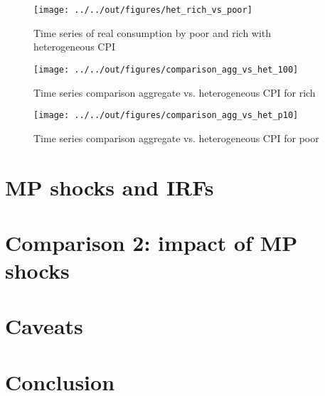 \documentclass{article}
\begin{document}
\begin{figure}
	\centering
	\texttt{[image: ../../out/figures/het\_rich\_vs\_poor]}
	\caption{Time series of real consumption by poor and rich with heterogeneous CPI }
	\label{f2}
\end{figure}

\begin{figure}
	\centering
    \texttt{[image: ../../out/figures/comparison\_agg\_vs\_het\_100]}
	\caption{Time series comparison aggregate vs. heterogeneous CPI for rich}
	\label{f3}
\end{figure}

\begin{figure}
	\centering
	\texttt{[image: ../../out/figures/comparison\_agg\_vs\_het\_p10]}
	\caption{Time series comparison aggregate vs. heterogeneous CPI for poor}
	\label{f4}
\end{figure}

\section{MP shocks and IRFs}\label{shocks}

\section{Comparison 2: impact of MP shocks}\label{res2}

\section{Caveats}

\section{Conclusion}\label{con}


\newpage
{}


\end{document}
